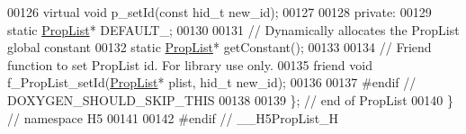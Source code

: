 \begin{DoxyCode}
00126         \textcolor{keyword}{virtual} \textcolor{keywordtype}{void} p\_setId(\textcolor{keyword}{const} hid\_t new\_id);
00127 
00128     \textcolor{keyword}{private}:
00129         \textcolor{keyword}{static} \hyperlink{class_h5_1_1_prop_list}{PropList}* DEFAULT\_;
00130 
00131         \textcolor{comment}{// Dynamically allocates the PropList global constant}
00132         \textcolor{keyword}{static} \hyperlink{class_h5_1_1_prop_list}{PropList}* getConstant();
00133 
00134         \textcolor{comment}{// Friend function to set PropList id.  For library use only.}
00135         \textcolor{keyword}{friend} \textcolor{keywordtype}{void} f\_PropList\_setId(\hyperlink{class_h5_1_1_prop_list}{PropList}* plist, hid\_t new\_id);
00136 
00137 \textcolor{preprocessor}{#endif // DOXYGEN\_SHOULD\_SKIP\_THIS}
00138 
00139 \}; \textcolor{comment}{// end of PropList}
00140 \} \textcolor{comment}{// namespace H5}
00141 
00142 \textcolor{preprocessor}{#endif  // \_\_H5PropList\_H}
\end{DoxyCode}
